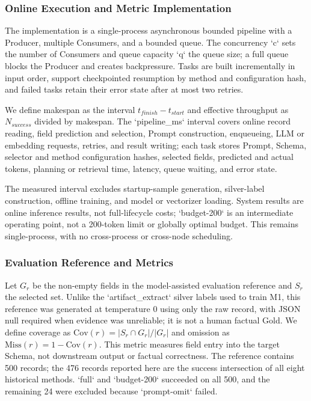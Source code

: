 \documentclass[runningheads]{llncs}
\begin{document}
\subsubsection{Online Execution and Metric Implementation}

The implementation is a single-process asynchronous bounded pipeline with a Producer, multiple Consumers, and a bounded queue. The concurrency `c` sets the number of Consumers and queue capacity `q` the queue size; a full queue blocks the Producer and creates backpressure. Tasks are built incrementally in input order, support checkpointed resumption by method and configuration hash, and failed tasks retain their error state after at most two retries.

We define makespan as the interval $t_{finish}-t_{start}$ and effective throughput as $N_{success}$ divided by makespan. The `pipeline_ms` interval covers online record reading, field prediction and selection, Prompt construction, enqueueing, LLM or embedding requests, retries, and result writing; each task stores Prompt, Schema, selector and method configuration hashes, selected fields, predicted and actual tokens, planning or retrieval time, latency, queue waiting, and error state.

The measured interval excludes startup-sample generation, silver-label construction, offline training, and model or vectorizer loading. System results are online inference results, not full-lifecycle costs; `budget-200` is an intermediate operating point, not a 200-token limit or globally optimal budget. This remains single-process, with no cross-process or cross-node scheduling.

\subsubsection{Evaluation Reference and Metrics}

Let $G_r$ be the non-empty fields in the model-assisted evaluation reference and $S_r$ the selected set. Unlike the `artifact_extract` silver labels used to train M1, this reference was generated at temperature 0 using only the raw record, with JSON null required when evidence was unreliable; it is not a human factual Gold. We define coverage as $\mathrm{Cov}(r)=|S_r\cap G_r|/|G_r|$ and omission as $\mathrm{Miss}(r)=1-\mathrm{Cov}(r)$. This metric measures field entry into the target Schema, not downstream output or factual correctness. The reference contains 500 records; the 476 records reported here are the success intersection of all eight historical methods. `full` and `budget-200` succeeded on all 500, and the remaining 24 were excluded because `prompt-omit` failed.
\end{document}
